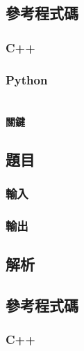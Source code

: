 \documentclass[a4paper,10pt]{article}
\begin{document}
\subsection{參考程式碼}

\subsubsection{C++}

%

\subsubsection{Python}

%

\section{}

\paragraph{關鍵}

\subsection{題目}



\subsubsection{輸入}



\subsubsection{輸出}



\subsection{解析}



\subsection{參考程式碼}

\subsubsection{C++}
\end{document}
